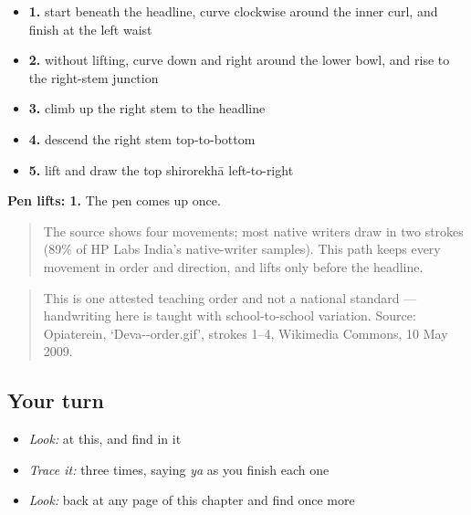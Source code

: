 \begin{itemize}
\raggedright
  \item \textbf{1.} start beneath the headline, curve clockwise around the inner curl, and finish at the left waist
  \item \textbf{2.} without lifting, curve down and right around the lower bowl, and rise to the right-stem junction
  \item \textbf{3.} climb up the right stem to the headline
  \item \textbf{4.} descend the right stem top-to-bottom
  \item \textbf{5.} lift and draw the top shirorekhā left-to-right
\end{itemize}

\textbf{Pen lifts: 1.} The pen comes up once.

\begin{quote}
The source shows four movements; most native writers draw  in two strokes (89\% of HP Labs India's native-writer samples). This path keeps every movement in order and direction, and lifts only before the headline.
\end{quote}

\begin{quote}
This is one attested teaching order and not a national standard — handwriting here is taught with school-to-school variation. Source: Opiaterein, ‘Deva--order.gif’, strokes 1–4, Wikimedia Commons, 10 May 2009.
\end{quote}

\subsection*{Your turn}
\begin{itemize}
\raggedright
  \item \emph{Look:} at this, and find  in it
\end{itemize}

\begin{quote}
\end{quote}

\begin{itemize}
\raggedright
  \item \emph{Trace it:}  three times, saying \emph{ya} as you finish each one
  \item \emph{Look:} back at any page of this chapter and find  once more
\end{itemize}


